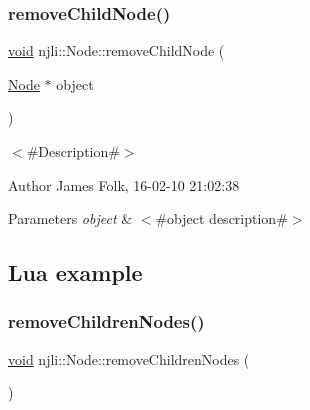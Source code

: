 \begin{DoxyCodeInclude}
\end{DoxyCodeInclude}
\mbox{\label{classnjli_1_1_node_a4901fc620d589b160ac7017ed671a1e1}} 
\subsubsection{\texorpdfstring{remove\+Child\+Node()}{removeChildNode()}\hspace{0.1cm}{\footnotesize\ttfamily [2/2]}}
{\footnotesize\ttfamily \mbox{\hyperlink{_thread_8h_af1e856da2e658414cb2456cb6f7ebc66}{void}} njli\+::\+Node\+::remove\+Child\+Node (\begin{DoxyParamCaption}\item[{\mbox{\hyperlink{classnjli_1_1_node}{Node}} $\ast$}]{object }\end{DoxyParamCaption})}



$<$\#\+Description\#$>$ 

\begin{DoxyAuthor}{Author}
James Folk, 16-\/02-\/10 21\+:02\+:38
\end{DoxyAuthor}

\begin{DoxyParams}{Parameters}
{\em object} & $<$\#object description\#$>$\\
\hline
\end{DoxyParams}
\hypertarget{classnjli_1_1_steering_behavior_wander_ex1}{}\subsection{Lua example}\label{classnjli_1_1_steering_behavior_wander_ex1}

\begin{DoxyCodeInclude}
\end{DoxyCodeInclude}
\mbox{\label{classnjli_1_1_node_ac78a32efc2fd1e3b57a5cd036a26350c}} 
\subsubsection{\texorpdfstring{remove\+Children\+Nodes()}{removeChildrenNodes()}}
{\footnotesize\ttfamily \mbox{\hyperlink{_thread_8h_af1e856da2e658414cb2456cb6f7ebc66}{void}} njli\+::\+Node\+::remove\+Children\+Nodes (\begin{DoxyParamCaption}{ }\end{DoxyParamCaption})}



